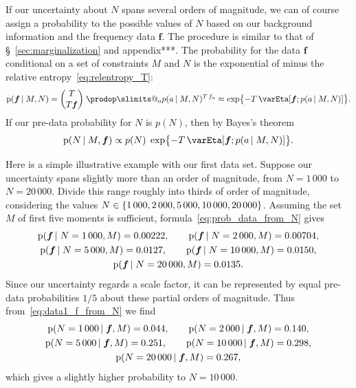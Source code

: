 \documentclass[\ifafour a4paper,12pt,\else a5paper,10pt,\fi%
onecolumn,oneside,article,%
british%
]{memoir}
\makeatletter
\theoremstyle{remark}
\theoremstyle{innote}
\def\prod{\DOTSI\prodop\slimits@}
\DeclarePairedDelimiter\set{\{}{\}}
\newcommand*{\pf}{\mathrm{p}}%
\renewcommand*{\|}{\nonscript\,\vert\nonscript\;\mathopen{}}
\newcommand*{\sect}{\S}%
\newcommand*{\yav}{a}
\newcommand*{\yff}{f}
\newcommand*{\yf}{\bm{\yff}}
\newcommand*{\ya}{\yav}%
\newcommand*{\pxx}{p}
\newcommand*{\sh}{\mathrm{\varEta}}
\makeatother
\begin{document}
If our uncertainty about $N$ spans several orders of magnitude, we can of
course assign a probability to the possible values of $N$ based on our
background information and the frequency data $\yf$. The procedure is
similar to that of \sect~\ref{sec:marginalization} and appendix***. The
probability for the data $\yf$ conditional on a set of constraints $M$ and
$N$ is the exponential of minus the relative entropy~\eqref{eq:relentropy_T}:
\begin{equation}
  \label{eq:prob_data_from_N}
  \pf(\yf \| M, N) = \binom{T}{T\yf}\;\prod_{a}\pxx(\ya \| M, N)^{T\,\yff_{a}}
  \approx \exp\bigl\{  -T\,\sh[\yf; \pxx(\ya \| M, N)]\bigr\}.
\end{equation}
If our pre-data probability for $N$ is $p(N)$, then by Bayes's theorem
\begin{equation}
  \label{eq:prob_N_from_data}
  \pf(N \| M, \yf) \propto
  p(N)\;\exp\bigl\{-T\,\sh[\yf; \pxx(\ya \| M, N)]\bigr\}.
\end{equation}

Here is a simple illustrative example with our first data set. Suppose our
uncertainty spans slightly more than an order of magnitude, from $N=1\,000$
to $N=20\,000$. Divide this range roughly into thirds of order of
magnitude, considering the values
$N\in \set{1\,000, 2\,000, 5\,000, 10\,000, 20\,000}$. Assuming the set $M$
of first five moments is sufficient, formula~\eqref{eq:prob_data_from_N}
gives
\begin{equation}
  \label{eq:data1_f_from_N}
  \begin{gathered}
  \pf(\yf \| N=1\,000, M) =  0.00222,\qquad
  \pf(\yf \| N=2\,000, M) =  0.00704,\\
  \pf(\yf \| N=5\,000, M) =  0.0127,\qquad
  \pf(\yf \| N=10\,000, M) =  0.0150,\\
  \pf(\yf \| N=20\,000, M) =  0.0135.
\end{gathered}
\end{equation}
Since our uncertainty regards a scale factor, it can be represented by
equal pre-data probabilities $1/5$ about these partial orders of magnitude.
Thus from~\eqref{eq:data1_f_from_N} we find
\begin{equation}
  \label{eq:data1_N_from_f}
  \begin{gathered}
  \pf(N=1\,000 \| \yf, M) =  0.044,\qquad
  \pf(N=2\,000 \| \yf, M) =  0.140,\\
  \pf(N=5\,000 \| \yf, M) =  0.251,\qquad
  \pf(N=10\,000 \| \yf, M) =  0.298,\\
  \pf(N=20\,000 \| \yf, M) =  0.267,
\end{gathered}
\end{equation}
which gives a slightly higher probability to $N=10\,000$.
\end{document}
